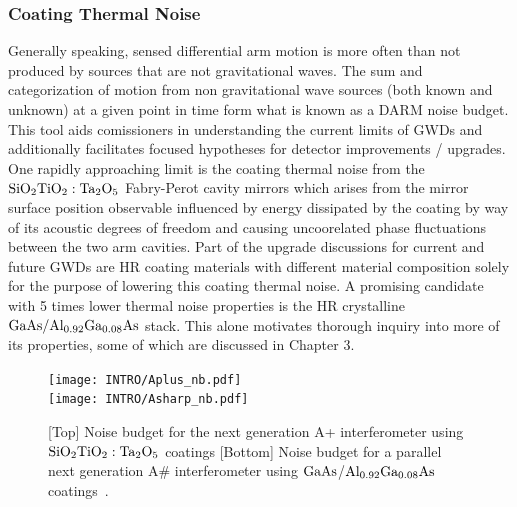 \subsubsection{Coating Thermal Noise}\label{subsubsec:introctn}
Generally speaking, sensed differential arm motion is more often than not produced by sources that are not gravitational waves. The sum and categorization of motion from non gravitational wave sources (both known and unknown) at a given point in time form what is known as a DARM noise budget. This tool aids comissioners in understanding the current limits of GWDs and additionally facilitates focused hypotheses for detector improvements / upgrades. One rapidly approaching limit is the coating thermal noise from the $\mathrm{SiO_2}\mathrm{TiO_2:Ta_2O_5}$ Fabry-Perot cavity mirrors which arises from the mirror surface position observable influenced by energy dissipated by the coating by way of its acoustic degrees of freedom and causing uncoorelated phase fluctuations between the two arm cavities. Part of the upgrade discussions for current and future GWDs are HR coating materials with different material composition solely for the purpose of lowering this coating thermal noise. A promising candidate with 5 times lower thermal noise properties is the HR crystalline $\mathrm{GaAs}/\mathrm{Al_{0.92}Ga_{0.08}As}$ stack. This alone motivates thorough inquiry into more of its properties, some of which are discussed in Chapter 3.   

\begin{figure}[ht!]
    \centering
    \begin{subcaptiongroup}
		\texttt{[image: INTRO/Aplus\_nb.pdf]}
		\\
		\texttt{[image: INTRO/Asharp\_nb.pdf]}
    \end{subcaptiongroup}
    \hfill
    \caption{[Top] Noise budget for the next generation A+ interferometer using $\mathrm{SiO_2}\mathrm{TiO_2:Ta_2O_5}$ coatings [Bottom] Noise budget for a parallel next generation A\# interferometer using $\mathrm{GaAs}$/$\mathrm{Al_{0.92}Ga_{0.08}As}$ coatings~\cite{dcc:asharp}.}
\label{fig:aplusasharp}
\end{figure}


